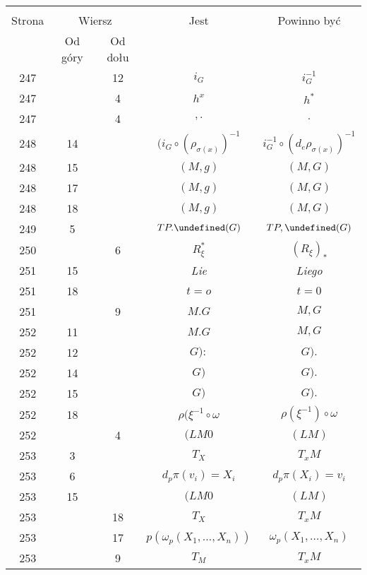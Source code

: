 \documentclass[a4paper,11pt]{article}
\newcommand{\mc}{\mathcal}
\newcommand{\ld}{\ldots}
\newcommand{\om}{\omega}
\newcommand{\s}{\sigma}
\let\L\undefined
\newcommand{\L}{\mc{L}}
\begin{document}
\begin{center}
  \begin{tabular}{|c|c|c|c|c|}
    \hline
    & \multicolumn{2}{c|}{} & & \\
    Strona & \multicolumn{2}{c|}{Wiersz}& Jest & Powinno być \\ \cline{2-3}
    & Od góry & Od dołu &  &  \\ \hline
    247 & & 12 & $i_{ G }$ & $i_{ G }^{ -1 }$ \\
    247 & & 4 & $h^{ x }$ & $h^{ * }$ \\
    247 & & 4 & $, .$ & $.$ \\
    248 & 14 & & $( i_{ G } \circ ( \rho_{ \s( x ) } )^{ -1 }$
           & $i_{ G }^{ -1 } \circ ( d_{ e }\rho_{ \s( x ) } )^{ -1 }$ \\
    248 & 15 & & $( M, g )$ & $( M, G )$ \\
    248 & 17 & & $( M, g )$ & $( M, G )$ \\
    248 & 18 & & $( M, g )$ & $( M, G )$ \\
    249 & 5 & & $TP.\L(G)$ & $TP, \L(G)$ \\
    250 & & 6 & $R_{ \xi }^{ * }$ & $( R_{ \xi } )_{ * }$ \\
    251 & 15 & & \emph{Lie} & \emph{Liego} \\
    251 & 18 & & $t = o$ & $t = 0$ \\
    251 & & 9 & $M.G$ & $M, G$ \\
    252 & 11 & & $M.G$ & $M, G$ \\
    252 & 12 & & $G):$ & $G).$ \\
    252 & 14 & & $G)$ & $G).$ \\
    252 & 15 & & $G)$ & $G).$ \\
    252 & 18 & & $\rho( \xi^{ -1 } \circ \om$ & $\rho( \xi^{ -1 } )
                                                \circ \om$ \\
    252 & & 4 & $( LM 0$ & $( LM )$ \\
    253 & 3 & & $T_{ X }$ & $T_{ x }M$ \\
    253 & 6 & & $d_{ p } \pi( v_{ i } ) = X_ { i }$
           & $d_{ p } \pi( X_{ i }) = v_ { i }$ \\
    253 & 15 & & $( LM 0$ & $( LM )$ \\
    253 & & 18 & $T_{ X }$ & $T_{ x }M$ \\
    253 & & 17 & $p( \om_{ p }( X_{ 1 }, \ld, X_{ n } ) )$
           & $\om_{ p }( X_{ 1 }, \ld, X_{ n } )$ \\
    253 & & 9 & $T_{ M }$ & $T_{ x }M$ \\

\end{tabular}
\end{center}
\end{document}
